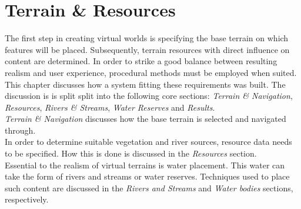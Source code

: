 \chapter{Terrain \& Resources} \label{chap:terrain_and_resources}

The first step in creating virtual worlds is specifying the base terrain on which features will be placed. Subsequently, terrain resources with direct influence on content are determined. In order to strike a good balance between resulting realism and user experience, procedural methods must be employed when suited.\\
This chapter discusses how a system fitting these requirements was built. The discussion is is split split into the following core sections: \textit{Terrain \& Navigation}, \textit{Resources}, \textit{Rivers \& Streams}, \textit{Water Reserves} and \textit{Results}.\\
\textit{Terrain \& Navigation} discusses how the base terrain is selected and navigated through. \\
In order to determine suitable vegetation and river sources, resource data needs to be specified. How this is done is discussed in the \textit{Resources} section.\\
Essential to the realism of virtual terrains is water placement. This water can take the form of rivers and streams or water reserves. Techniques used to place such content are discussed in the \textit{Rivers and Streams} and \textit{Water bodies} sections, respectively. \\

